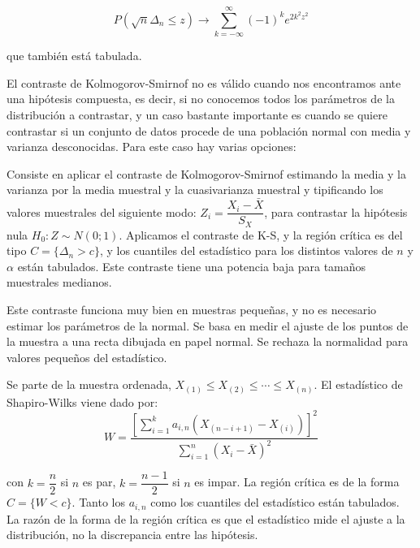\[P\left(\sqrt{n}\Delta_n\leq z\right)\to\sum_{k=-\infty}^{\infty}(-1)^ke^{2k^2z^2}\]

que tambi\'en est\'a tabulada.


El contraste de Kolmogorov-Smirnof no es v\'alido cuando nos encontramos ante una hip\'otesis compuesta, es decir, si no conocemos todos los par\'ametros de la distribuci\'on a contrastar, y un caso bastante importante es cuando se quiere contrastar si un conjunto de datos procede de una poblaci\'on normal con media y varianza desconocidas. Para este caso hay varias opciones:


Consiste en aplicar el contraste de Kolmogorov-Smirnof estimando la media y la varianza por la media muestral y la cuasivarianza muestral y tipificando los valores muestrales del siguiente modo: $Z_i=\dfrac{X_i-\bar{X}}{S_X}$, para contrastar la hip\'otesis nula $H_0:Z\sim N(0;1)$. Aplicamos el contraste de K-S, y la regi\'on cr\'itica es del tipo $C=\{\Delta_n>c\}$, y los cuantiles del estad\'istico para los distintos valores de $n$ y $\alpha$ est\'an tabulados. Este contraste tiene una potencia baja para tama\~nos muestrales medianos.


Este contraste funciona muy bien en muestras peque\~nas, y no es necesario estimar los par\'ametros de la normal. Se basa en medir el ajuste de los puntos de la muestra a una recta dibujada en papel normal. Se rechaza la normalidad para valores peque\~nos del estad\'istico.

Se parte de la muestra ordenada, $X_{(1)}\leq X_{(2)}\leq\cdots\leq X_{(n)}$. El estad\'istico de Shapiro-Wilks viene dado por:
\[W=\dfrac{\left[\sum_{i=1}^ka_{i,n}(X_{(n-i+1)}-X_{(i)})\right]^2}{\sum_{i=1}^n(X_i-\bar{X})^2}\]

con $k=\dfrac{n}{2}$ si $n$ es par, $k=\dfrac{n-1}{2}$ si $n$ es impar. La regi\'on cr\'itica es de la forma $C=\{W<c\}$. Tanto los $a_{i,n}$ como los cuantiles del estad\'istico est\'an tabulados. La raz\'on de la forma de la regi\'on cr\'itica es que el estad\'istico mide el ajuste a la distribuci\'on, no la discrepancia entre las hip\'otesis.



